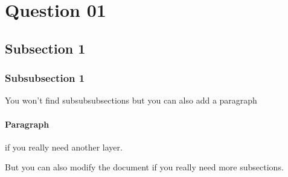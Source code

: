 \section{Question 01}
\subsection{Subsection 1}
\subsubsection{Subsubsection 1}
You won't find subsubsubsections but you can also add a paragraph
\paragraph{Paragraph} 

if you really need another layer.

But you can also modify the document if you really need more subsections.
